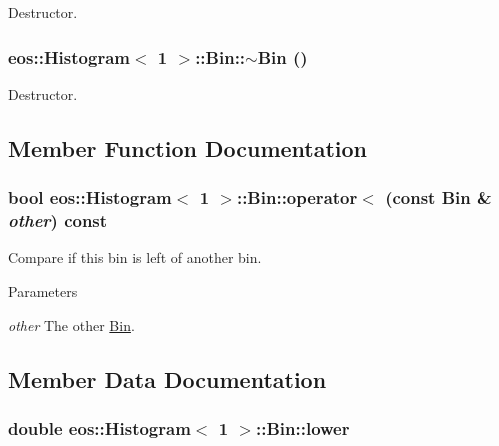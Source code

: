 Destructor. \hypertarget{structeos_1_1Histogram_3_011_01_4_1_1Bin_a5da88553377af08fad99aa914a634c38}{
\subsubsection[{$\sim$Bin}]{\setlength{\rightskip}{0pt plus 5cm}eos::Histogram$<$ 1 $>$::Bin::$\sim$Bin ()}}
\label{structeos_1_1Histogram_3_011_01_4_1_1Bin_a5da88553377af08fad99aa914a634c38}


Destructor. 

\subsection{Member Function Documentation}
\hypertarget{structeos_1_1Histogram_3_011_01_4_1_1Bin_ada41b1d9c9cbec8e57ee4e96558e558b}{
\subsubsection[{operator$<$}]{\setlength{\rightskip}{0pt plus 5cm}bool eos::Histogram$<$ 1 $>$::Bin::operator$<$ (const Bin \& {\em other}) const}}
\label{structeos_1_1Histogram_3_011_01_4_1_1Bin_ada41b1d9c9cbec8e57ee4e96558e558b}
Compare if this bin is left of another bin.


\begin{DoxyParams}{Parameters}
\item[{\em other}]The other \hyperlink{structeos_1_1Histogram_3_011_01_4_1_1Bin}{Bin}. \end{DoxyParams}


\subsection{Member Data Documentation}
\hypertarget{structeos_1_1Histogram_3_011_01_4_1_1Bin_a1b79f2bf22a180397c8ce9d344e4eabf}{
\subsubsection[{lower}]{\setlength{\rightskip}{0pt plus 5cm}double eos::Histogram$<$ 1 $>$::Bin::lower}}
\label{structeos_1_1Histogram_3_011_01_4_1_1Bin_a1b79f2bf22a180397c8ce9d344e4eabf}



